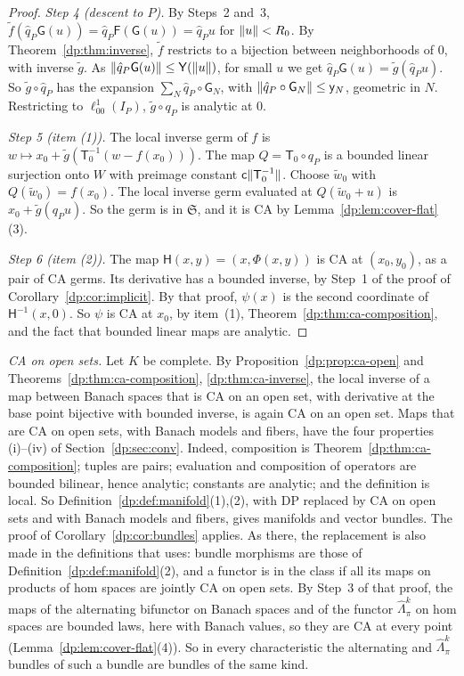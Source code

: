 \begin{proof}
\emph{Step 4 (descent to $P$).} By Steps~2 and~3, $\tilde f(\hat q_P\mathsf G(u))=\hat q_P\mathsf F(\mathsf G(u))=\hat q_Pu$ for $\lVert u\rVert<R_0$. By Theorem~\ref{dp:thm:inverse}, $\tilde f$ restricts to a bijection between neighborhoods of $0$, with inverse $\tilde g$. As $\lVert \hat q_P\mathsf G(u)\rVert\le\mathsf Y(\lVert u\rVert)$, for small $u$ we get $\hat q_P\mathsf G(u)=\tilde g(\hat q_Pu)$. So $\tilde g\circ\hat q_P$ has the expansion $\sum_N\hat q_P\circ\mathsf G_N$, with $\lVert \hat q_P\circ\mathsf G_N\rVert\le\mathsf y_N$, geometric in $N$. Restricting to $\ell^1_{00}(I_P)$, $\tilde g\circ q_P$ is analytic at $0$.

\emph{Step 5 (item (1)).} The local inverse germ of $f$ is $w\mapsto x_0+\tilde g(\mathsf T_0^{-1}(w-f(x_0)))$. The map $Q=\mathsf T_0\circ q_P$ is a bounded linear surjection onto $W$ with preimage constant $\mathsf c\lVert \mathsf T_0^{-1}\rVert$. Choose $\tilde w_0$ with $Q(\tilde w_0)=f(x_0)$. The local inverse germ evaluated at $Q(\tilde w_0+u)$ is $x_0+\tilde g(q_Pu)$. So the germ is in $\mathfrak S$, and it is CA by Lemma~\ref{dp:lem:cover-flat}(3).

\emph{Step 6 (item (2)).} The map $\mathsf H(x,y)=(x,\Phi(x,y))$ is CA at $(x_0,y_0)$, as a pair of CA germs. Its derivative has a bounded inverse, by Step~1 of the proof of Corollary~\ref{dp:cor:implicit}. By that proof, $\psi(x)$ is the second coordinate of $\mathsf H^{-1}(x,0)$. So $\psi$ is CA at $x_0$, by item~(1), Theorem~\ref{dp:thm:ca-composition}, and the fact that bounded linear maps are analytic.
\end{proof}

\emph{CA on open sets.} Let $K$ be complete. By Proposition~\ref{dp:prop:ca-open} and Theorems~\ref{dp:thm:ca-composition}, \ref{dp:thm:ca-inverse}, the local inverse of a map between Banach spaces that is CA on an open set, with derivative at the base point bijective with bounded inverse, is again CA on an open set. Maps that are CA on open sets, with Banach models and fibers, have the four properties (i)--(iv) of Section~\ref{dp:sec:conv}. Indeed, composition is Theorem~\ref{dp:thm:ca-composition}; tuples are pairs; evaluation and composition of operators are bounded bilinear, hence analytic; constants are analytic; and the definition is local. So Definition~\ref{dp:def:manifold}(1),(2), with DP replaced by CA on open sets and with Banach models and fibers, gives manifolds and vector bundles. The proof of Corollary~\ref{dp:cor:bundles} applies. As there, the replacement is also made in the definitions that \cite[Theorem~2.1]{I} uses: bundle morphisms are those of Definition~\ref{dp:def:manifold}(2), and a functor is in the class if all its maps on products of hom spaces are jointly CA on open sets. By Step~3 of that proof, the maps of the alternating bifunctor on Banach spaces and of the functor $\widehat\Lambda^k_\pi$ on hom spaces are bounded laws, here with Banach values, so they are CA at every point (Lemma~\ref{dp:lem:cover-flat}(4)). So in every characteristic the alternating and $\widehat\Lambda^k_\pi$ bundles of such a bundle are bundles of the same kind.

